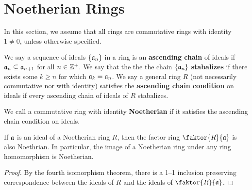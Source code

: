 \section{Noetherian Rings}
\label{section_5.9}

In this section, we assume that all rings are commutative rings with
identity $1 \neq 0$, unless otherwise specified.

\begin{definition}
  We say a sequence of ideals $\{\mathfrak{a}_n\}$ in a ring is an
  \textbf{ascending chain} of ideals if $\mathfrak{a}_n \subseteq \mathfrak{a}_{n+1}$
  for all $n \in \mathbb{Z}^+$. We say that the the the chain $\{\mathfrak{a}_n\}$
  \textbf{stabalizes} if there exists some $k \geq n$ for which
  $\mathfrak{a}_k=\mathfrak{a}_n$. We say a general ring $R$ (not necessarily commutative
  nor with identity) satisfies the \textbf{ascending chain condition}
  on ideals if every ascending chain of ideals of $R$ stabalizes.
\end{definition}

\begin{definition}
  We call a commutative ring with identity \textbf{Noetherian} if it
  satisfies the ascending chain condition on ideals.
\end{definition}

\begin{lemma}\label{lemma_5.9.1}
  If $\mathfrak{a}$ is an ideal of a Noetherian ring  $R$, then the factor ring
  $\faktor{R}{\af}$ is also Noethrian. In particular, the image of a Noetherian
  ring under any ring homomorphism is Noetherian.
\end{lemma}
\begin{proof}
    By the fourth isomorphism theorem, there is a 1--1 inclusion
    preserving correspondence between the ideals of $R$ and the ideals
    of $\faktor{R}{\af}$.
\end{proof}

